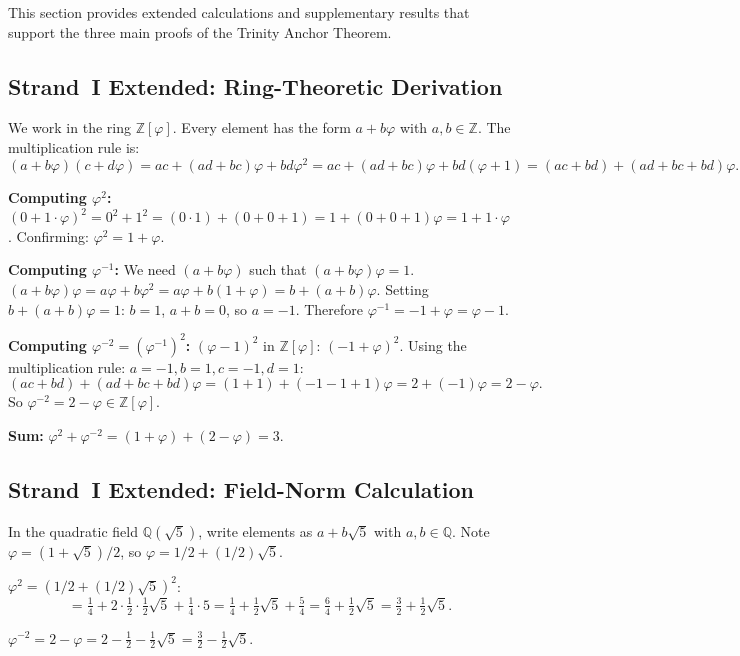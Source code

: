 This section provides extended calculations and supplementary
results that support the three main proofs of the Trinity
Anchor Theorem.

\subsection{Strand~I Extended: Ring-Theoretic Derivation}

We work in the ring $\mathbb{Z}[\varphi]$.
Every element has the form $a + b\varphi$ with $a, b \in \mathbb{Z}$.
The multiplication rule is:
\[
  (a+b\varphi)(c+d\varphi)
  = ac + (ad+bc)\varphi + bd\varphi^{2}
  = ac + (ad+bc)\varphi + bd(\varphi+1)
  = (ac+bd) + (ad+bc+bd)\varphi.
\]

\textbf{Computing $\varphi^{2}$:}
$(0+1\cdot\varphi)^{2} = 0^{2}+1^{2} = (0 \cdot 1)+(0+0+1) = 1+(0+0+1)\varphi = 1+1\cdot\varphi$.
Confirming: $\varphi^{2} = 1 + \varphi$.

\textbf{Computing $\varphi^{-1}$:}
We need $(a+b\varphi)$ such that $(a+b\varphi)\varphi = 1$.
$(a+b\varphi)\varphi = a\varphi + b\varphi^{2} = a\varphi + b(1+\varphi) = b + (a+b)\varphi$.
Setting $b+(a+b)\varphi = 1$: $b=1$, $a+b=0$, so $a=-1$.
Therefore $\varphi^{-1} = -1+\varphi = \varphi-1$.

\textbf{Computing $\varphi^{-2} = (\varphi^{-1})^{2}$:}
$(\varphi-1)^{2}$ in $\mathbb{Z}[\varphi]$:
$(-1+\varphi)^{2}$. Using the multiplication rule:
$a=-1, b=1, c=-1, d=1$:
\[
  (ac+bd) + (ad+bc+bd)\varphi
  = (1+1) + (-1-1+1)\varphi
  = 2 + (-1)\varphi
  = 2 - \varphi.
\]
So $\varphi^{-2} = 2 - \varphi \in \mathbb{Z}[\varphi]$.

\textbf{Sum:}
$\varphi^{2}+\varphi^{-2} = (1+\varphi)+(2-\varphi) = 3$.

\subsection{Strand~I Extended: Field-Norm Calculation}

In the quadratic field $\mathbb{Q}(\sqrt{5})$, write elements
as $a+b\sqrt{5}$ with $a,b \in \mathbb{Q}$.
Note $\varphi = (1+\sqrt{5})/2$, so $\varphi = 1/2 + (1/2)\sqrt{5}$.

$\varphi^{2} = (1/2 + (1/2)\sqrt{5})^{2}$:
\[
  = \tfrac{1}{4} + 2 \cdot \tfrac{1}{2} \cdot \tfrac{1}{2}\sqrt{5}
    + \tfrac{1}{4} \cdot 5
  = \tfrac{1}{4} + \tfrac{1}{2}\sqrt{5} + \tfrac{5}{4}
  = \tfrac{6}{4} + \tfrac{1}{2}\sqrt{5}
  = \tfrac{3}{2} + \tfrac{1}{2}\sqrt{5}.
\]

$\varphi^{-2} = 2 - \varphi = 2 - \tfrac{1}{2} - \tfrac{1}{2}\sqrt{5}
= \tfrac{3}{2} - \tfrac{1}{2}\sqrt{5}$.

